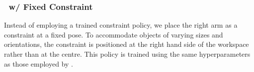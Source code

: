 \subsubsection{\ourmethod~w/ Fixed Constraint}
Instead of employing a trained constraint policy, we place the right arm as a constraint at a fixed pose.
To accommodate objects of varying sizes and orientations, the constraint is positioned at the right hand side of the workspace rather than at the centre.
This policy is trained using the same hyperparameters as those employed by \ourmethod.
